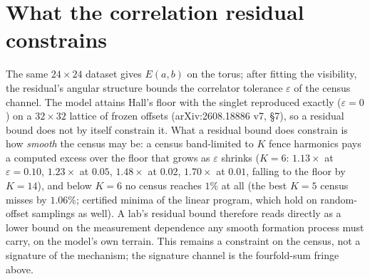 \documentclass[10pt]{article}
\begin{document}
\section*{What the correlation residual constrains}
The same $24\times24$ dataset gives $E(a,b)$ on the torus; after fitting the visibility, the residual's angular structure bounds the correlator tolerance $\varepsilon$ of the census channel. The model attains Hall's floor with the singlet reproduced exactly ($\varepsilon=0$) on a $32\times32$ lattice of frozen offsets (arXiv:2608.18886 v7, \S7), so a residual bound does not by itself constrain it. What a residual bound does constrain is how \emph{smooth} the census may be: a census band-limited to $K$ fence harmonics pays a computed excess over the floor that grows as $\varepsilon$ shrinks ($K=6$: $1.13\times$ at $\varepsilon=0.10$, $1.23\times$ at $0.05$, $1.48\times$ at $0.02$, $1.70\times$ at $0.01$, falling to the floor by $K=14$), and below $K=6$ no census reaches $1\%$ at all (the best $K=5$ census misses by $1.06\%$; certified minima of the linear program, which hold on random-offset samplings as well). A lab's residual bound therefore reads directly as a lower bound on the measurement dependence any smooth formation process must carry, on the model's own terrain. This remains a constraint on the census, not a signature of the mechanism; the signature channel is the fourfold-sum fringe above.
\end{document}
